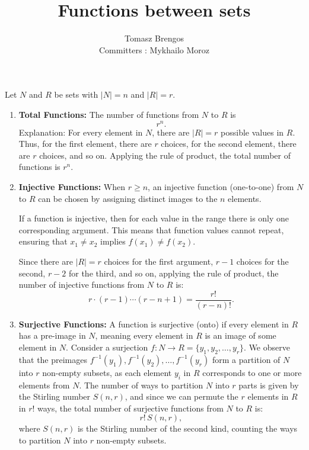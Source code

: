 \documentclass[docmute]{article}
\title{Functions between sets}
\author{Tomasz Brengos \\  
Committers : Mykhailo Moroz}
\date{}
\begin{document}
\maketitle
Let $N$ and $R$ be sets with $|N| = n$ and $|R| = r$.

\begin{enumerate}[label=(\roman*)]
    \item \textbf{Total Functions:}  
    The number of functions from \( N \) to \( R \) is  
    \[
    r^n.
    \]  
    Explanation: For every element in \( N \), there are \( |R| = r \) possible values in \( R \). Thus, for the first element, there are \( r \) choices, for the second element, there are \( r \) choices, and so on.  
    Applying the rule of product, the total number of functions is \( r^n \).

    \item \textbf{Injective Functions:}  
    When \( r \geq n \), an injective function (one-to-one) from \( N \) to \( R \) can be chosen by assigning distinct images to the \( n \) elements.  

    If a function is injective, then for each value in the range there is only one corresponding argument. This means that function values cannot repeat, ensuring that \( x_1 \neq x_2 \) implies \( f(x_1) \neq f(x_2) \).  

    Since there are \( |R| = r \) choices for the first argument, \( r-1 \) choices for the second, \( r-2 \) for the third, and so on, applying the rule of product, the number of injective functions from \( N \) to \( R \) is:  
    \[
    r \cdot (r-1) \cdots (r-n+1) = \frac{r!}{(r-n)!}.
    \]
    \item \textbf{Surjective Functions:}  
    A function is surjective (onto) if every element in \( R \) has a pre-image in \( N \), meaning every element in \( R \) is an image of some element in \( N \).  
    Consider a surjection \( f: N \to R = \{y_1, y_2, \dots, y_r\} \). We observe that the preimages \( f^{-1}(y_1), f^{-1}(y_2), \dots, f^{-1}(y_r) \) form a partition of \( N \) into \( r \) non-empty subsets, as each element \( y_i \) in \( R \) corresponds to one or more elements from \( N \).  
    The number of ways to partition \( N \) into \( r \) parts is given by the Stirling number \( S(n, r) \), and since we can permute the \( r \) elements in \( R \) in \( r! \) ways, the total number of surjective functions from \( N \) to \( R \) is:  
    \[
    r! \, S(n, r),
    \]
    where \( S(n, r) \) is the Stirling number of the second kind, counting the ways to partition \( N \) into \( r \) non-empty subsets.

\end{enumerate}
\end{document}
